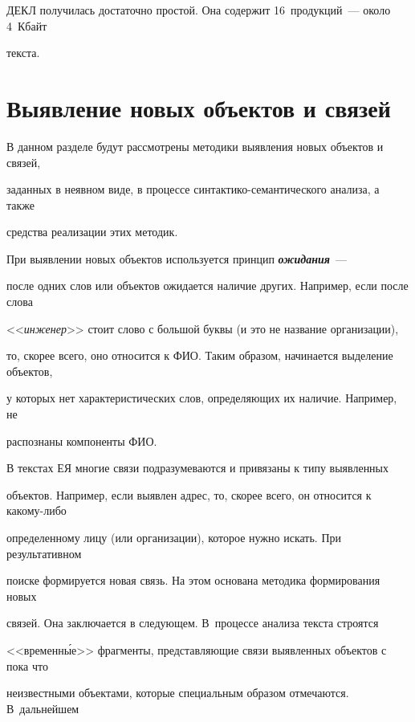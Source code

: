ДЕКЛ получилась достаточно простой. Она содержит 16~продукций~--- около 4~Кбайт 


текста. 





\section{Выявление новых объектов и связей}





В данном разделе будут рассмотрены методики выявления новых объектов и связей, 


заданных в неявном виде, в процессе синтактико-семантического анализа, а также 


средства реализации этих методик.





При выявлении новых объектов используется принцип {\bfseries\textit{ожидания}}~--- 


после одних слов или объектов ожидается наличие других. Например, если после слова 


<<\textit{инженер}>> стоит слово с большой буквы (и это не название организации), 


то, скорее всего, оно относится к ФИО. Таким образом, начинается выделение объектов, 


у которых нет характеристических слов, определяющих их наличие. Например, не 


распознаны компоненты ФИО. 





В текстах ЕЯ многие связи подразумеваются и привязаны к типу выявленных 


объектов. Например, если выявлен адрес, то, скорее всего, он относится к ка\-ко\-му-ли\-бо 


определенному лицу (или организации), которое нужно искать. При результативном 


поиске формируется новая связь. На этом основана методика формирования новых  


связей. Она заключается в следующем. В~процессе анализа текста строятся 


<<временн\'{ы}е>> фрагменты, представляющие связи выявленных объектов с пока что 


неизвестными объектами, которые специальным образом отмечаются.  В~дальнейшем 


